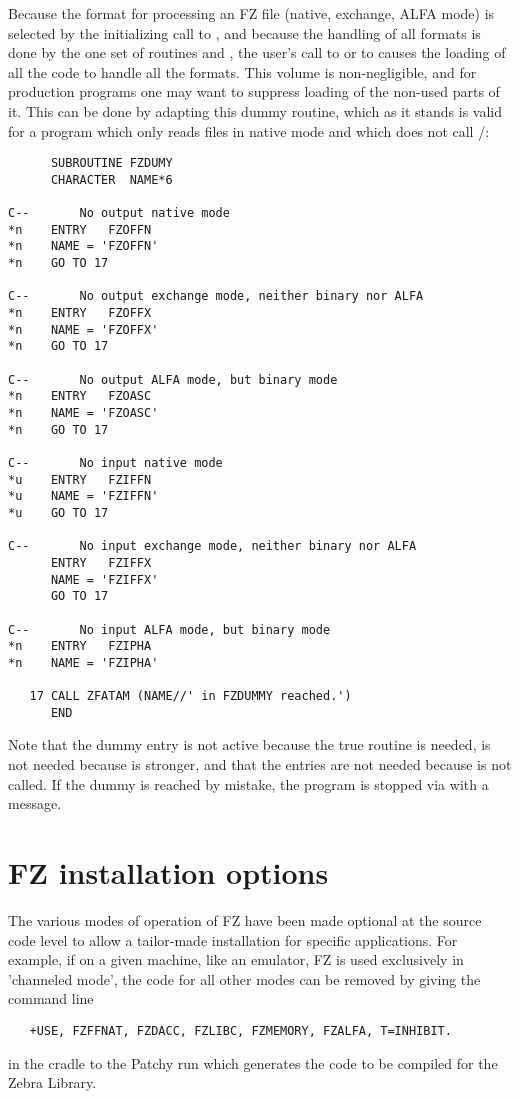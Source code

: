 Because the format for processing an FZ file
(native, exchange, ALFA mode)
is selected by the initializing call to ,
and because the handling of all formats is done
by the one set of routines  and ,
the user's call to  or to  causes the loading
of all the code to handle all the formats.
This volume is non-negligible,
and for production programs one may want to suppress
loading of the non-used parts of it.
This can be done by adapting this dummy routine,
which as it stands is valid for a program which only
reads files in native mode and which does not call
/:

\begin{verbatim}
      SUBROUTINE FZDUMY
      CHARACTER  NAME*6

C--       No output native mode
*n    ENTRY   FZOFFN
*n    NAME = 'FZOFFN'
*n    GO TO 17

C--       No output exchange mode, neither binary nor ALFA
*n    ENTRY   FZOFFX
*n    NAME = 'FZOFFX'
*n    GO TO 17

C--       No output ALFA mode, but binary mode
*n    ENTRY   FZOASC
*n    NAME = 'FZOASC'
*n    GO TO 17

C--       No input native mode
*u    ENTRY   FZIFFN
*u    NAME = 'FZIFFN'
*u    GO TO 17

C--       No input exchange mode, neither binary nor ALFA
      ENTRY   FZIFFX
      NAME = 'FZIFFX'
      GO TO 17

C--       No input ALFA mode, but binary mode
*n    ENTRY   FZIPHA
*n    NAME = 'FZIPHA'

   17 CALL ZFATAM (NAME//' in FZDUMMY reached.')
      END
\end{verbatim}

Note that the dummy entry  is not active because
the true routine is needed,  is not needed because
 is stronger, and that the entries  are not
needed because  is not called.
If the dummy is reached by mistake, the program is stopped
via  with a message.

\section{FZ installation options}

The various modes of operation
of FZ have been made optional at the source code level
to allow a tailor-made installation for specific applications.
For example, if on a given machine, like an emulator,
FZ is used exclusively in 'channeled mode',
the code for all other modes can be removed
by giving the command line
\begin{verbatim}
   +USE, FZFFNAT, FZDACC, FZLIBC, FZMEMORY, FZALFA, T=INHIBIT.
\end{verbatim}
in the cradle to the Patchy run which generates the code
to be compiled for the Zebra Library.

